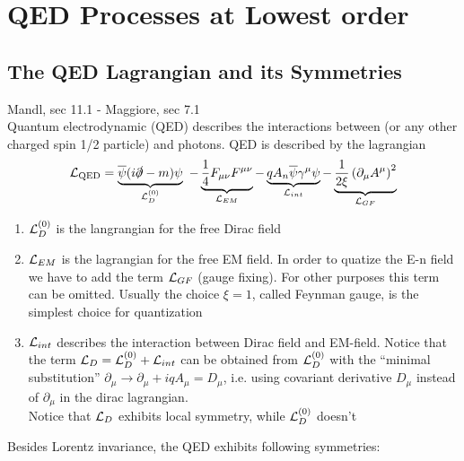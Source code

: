 \documentclass[TheoreticalPhy_ModB.tex]{subfiles}
\begin{document}
\chapter{QED Processes at Lowest order} %

\section{The QED Lagrangian and its Symmetries}
\textsf{Mandl, sec 11.1 - Maggiore, sec 7.1}\\
Quantum electrodynamic (QED) describes the interactions between (or any other charged spin 1/2 particle) and photons. QED is described by the lagrangian
\[
\mathcal{L}_{\text{QED}} =\underbrace{\overline{\psi }( i\slashed \partial -m) \psi }_{\mathcal{L}^{( 0)}_{D}} \ -\underbrace{\frac{1}{4} F_{\mu \nu } F^{\mu \nu }}_{\mathcal{L}_{EM}} -\underbrace{qA_{n}\overline{\psi } \gamma ^{\mu } \psi }_{\mathcal{L}_{int}} -\underbrace{\frac{1}{2\xi }\left( \partial _{\mu } A^{\mu }\right)^{2}}_{\mathcal{L}_{GF}}
\]
\begin{enumerate}
\item $\mathcal{L}_D^{(0)}$ is the langrangian for the free Dirac field
\item $\mathcal{L}_{EM}$ is the lagrangian for the free EM field. In order to quatize the E-n field we have to add the term $\mathcal{L}_{GF}$ (gauge fixing). For other purposes this term can be omitted. Usually the choice $\xi = 1$, called Feynman gauge, is the simplest choice for quantization
\item $\mathcal{L}_{int}$ describes the interaction between Dirac field and EM-field. Notice that the term $\mathcal{L}_D = \mathcal{L}_D^{(0)} + \mathcal{L}_{int}$ can be obtained from $\mathcal{L}_D^{(0)}$ with the ``minimal substitution'' $\partial_{\mu} \to \partial_{\mu} + iqA_{\mu} = D_{\mu}$, i.e. using covariant derivative $D_{\mu}$ instead of $\partial_{\mu}$ in the dirac lagrangian.\\
Notice that $\mathcal{L}_D$ exhibits local symmetry, while $\mathcal{L}_D^{(0)}$ doesn't
\end{enumerate}
Besides Lorentz invariance, the QED exhibits following symmetries:
\end{document}
